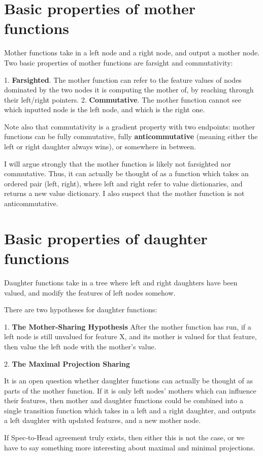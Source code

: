 
\section{Basic properties of mother functions}

Mother functions take in a left node and a right node, and output a mother node. Two basic properties of mother functions are farsight and commutativity:

1. \textbf{Farsighted}. The mother function can refer to the feature values of nodes dominated by the two nodes it is computing the mother of, by reaching through their left/right pointers. 
2. \textbf{Commutative}. The mother function cannot see which inputted node is the left node, and which is the right one. 

Note also that commutativity is a gradient property with two endpoints: mother functions can be fully commutative, fully \textbf{anticommutative} (meaning either the left or right daughter always wins), or somewhere in between. 

I will argue strongly that the mother function is likely not farsighted nor commutative. Thus, it can actually be thought of as a function which takes an ordered pair (left, right), where left and right refer to value dictionaries, and returns a new value dictionary. I also suspect that the mother function is not anticommutative.

\section{Basic properties of daughter functions}

Daughter functions take in a tree where left and right daughters have been valued, and modify the features of left nodes somehow. 

There are two hypotheses for daughter functions:

1. \textbf{The Mother-Sharing Hypothesis}
After the mother function has run, if a left node is still unvalued for feature X, and its mother is valued for that feature, then value the left node with the mother's value. 

2. \textbf{The Maximal Projection Sharing}






It is an open question whether daughter functions can actually be thought of as parts of the mother function. If it is only left nodes' mothers which can influence their features, then mother and daughter functions could be combined into a single transition function which takes in a left and a right daughter, and outputs a left daughter with updated features, and a new mother node. 

If Spec-to-Head agreement truly exists, then either this is not the case, or we have to say something more interesting about maximal and minimal projections.
